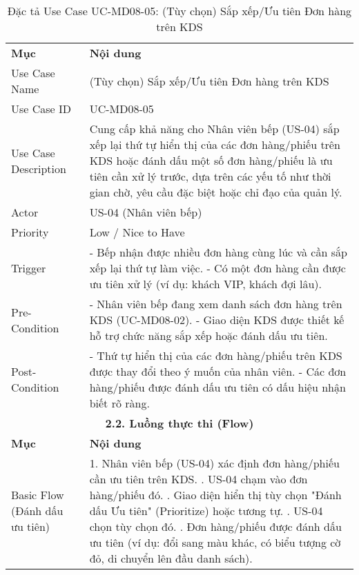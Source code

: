 \begin{longtable}{|m{4cm}|p{11cm}|}
\caption{Đặc tả Use Case UC-MD08-05: (Tùy chọn) Sắp xếp/Ưu tiên Đơn hàng trên KDS} \label{tab:uc_md08_05} \\
\hline

\endhead %
\hline
\endfoot %
\hline
\endlastfoot %
\multicolumn{2}{|c|}{\textbf{2.1. Tóm tắt (Summary)}} \\
\hline
\textbf{Mục} & \textbf{Nội dung} \\
\hline
Use Case Name & (Tùy chọn) Sắp xếp/Ưu tiên Đơn hàng trên KDS \\
\hline
Use Case ID & UC-MD08-05 \\
\hline
Use Case Description & Cung cấp khả năng cho Nhân viên bếp (US-04) sắp xếp lại thứ tự hiển thị của các đơn hàng/phiếu trên KDS hoặc đánh dấu một số đơn hàng/phiếu là ưu tiên cần xử lý trước, dựa trên các yếu tố như thời gian chờ, yêu cầu đặc biệt hoặc chỉ đạo của quản lý. \\
\hline
Actor & US-04 (Nhân viên bếp) \\
\hline
Priority & Low / Nice to Have \\
\hline
Trigger & - Bếp nhận được nhiều đơn hàng cùng lúc và cần sắp xếp lại thứ tự làm việc. \newline - Có một đơn hàng cần được ưu tiên xử lý (ví dụ: khách VIP, khách đợi lâu). \\
\hline
Pre-Condition & - Nhân viên bếp đang xem danh sách đơn hàng trên KDS (UC-MD08-02). \newline - Giao diện KDS được thiết kế hỗ trợ chức năng sắp xếp hoặc đánh dấu ưu tiên. \\
\hline
Post-Condition & - Thứ tự hiển thị của các đơn hàng/phiếu trên KDS được thay đổi theo ý muốn của nhân viên. \newline - Các đơn hàng/phiếu được đánh dấu ưu tiên có dấu hiệu nhận biết rõ ràng. \\
\hline
\multicolumn{2}{|c|}{\textbf{2.2. Luồng thực thi (Flow)}} \\
\hline
\textbf{Mục} & \textbf{Nội dung} \\
\hline
Basic Flow (Đánh dấu ưu tiên) & 1. Nhân viên bếp (US-04) xác định đơn hàng/phiếu cần ưu tiên trên KDS. \newline 2. US-04 chạm vào đơn hàng/phiếu đó. \newline 3. Giao diện hiển thị tùy chọn "Đánh dấu Ưu tiên" (Prioritize) hoặc tương tự. \newline 4. US-04 chọn tùy chọn đó. \newline 5. Đơn hàng/phiếu được đánh dấu ưu tiên (ví dụ: đổi sang màu khác, có biểu tượng cờ đỏ, di chuyển lên đầu danh sách). \\

\end{longtable}
